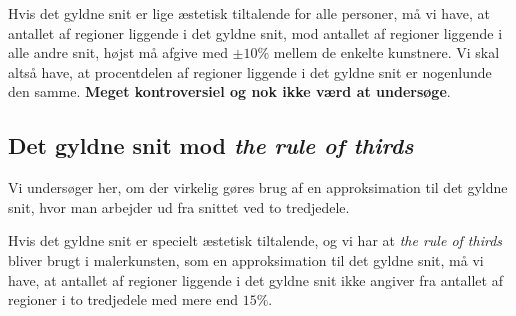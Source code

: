 {\begin{hypotese}
    Hvis det gyldne snit er lige æstetisk tiltalende for alle personer,
    må vi have, at antallet af regioner liggende i det gyldne snit, mod
    antallet af regioner liggende i alle andre snit, højst må afgive med
    $\pm10\%$ mellem de enkelte kunstnere. Vi skal altså have, at
    procentdelen af regioner liggende i det gyldne snit er nogenlunde
    den samme.  \textbf{Meget kontroversiel og nok ikke værd
    at undersøge}.
\end{hypotese}

\subsection{Det gyldne snit mod \emph{the rule of thirds}}
Vi undersøger her, om der virkelig gøres brug af en approksimation til
det gyldne snit, hvor man arbejder ud fra snittet ved to tredjedele.

\begin{hypotese}
    Hvis det gyldne snit er specielt æstetisk tiltalende, og vi har at
    \emph{the rule of thirds} bliver brugt i malerkunsten, som en
    approksimation til det gyldne snit, må vi have, at antallet af
    regioner liggende i det gyldne snit ikke angiver fra antallet af
    regioner i to tredjedele med mere end $15\%$.
\end{hypotese}

}
